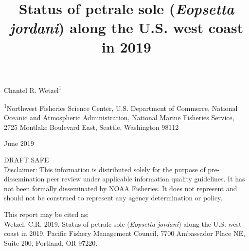 \documentclass[12pt,]{article}
\title{Status of petrale sole (\emph{Eopsetta jordani}) along the U.S. west
coast in 2019}
\author{}
\date{}
\begin{document}
\maketitle


\begin{center}
\thispagestyle{empty}


\vspace{.5cm}




Chantel R. Wetzel\textsuperscript{1}\\


\vspace{.5cm}

\small
\textsuperscript{1}Northwest Fisheries Science Center, U.S. Department of Commerce, National Oceanic and Atmospheric Administration, National Marine Fisheries Service, 2725 Montlake Boulevard East, Seattle, Washington 98112\\

\vspace{.3cm}





\vspace{1cm}

\vfill
June 2019

\vspace{1cm}

DRAFT SAFE\\
Disclaimer: This information is distributed solely for the purpose of pre-dissemination
peer review under applicable information quality guidelines. It has not been formally
disseminated by NOAA Fisheries. It does not represent and should not be construed to
represent any agency determination or policy. 


\vspace{.3cm}

\newpage

\vspace{3cm}

This report may be cited as:\\

Wetzel, C.R. 2019. Status of petrale sole (\textit{Eopsetta jordani}) along the U.S. west coast in 2019. Pacific Fishery Management Council, 7700 Ambassador Place NE, Suite 200, Portland, OR 97220. 
\end{center}
\end{document}
